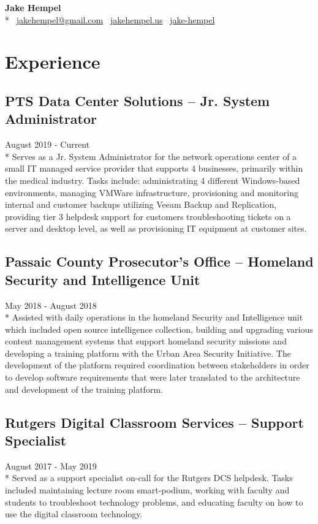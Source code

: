 \documentclass{article}
\begin{document}
\begin{samepage}
\begin{center}
\huge{\textbf{Jake Hempel}} \\*
\large{\faEnvelope \, \href{mailto:jakehempel@gmail.com}{jakehempel@gmail.com} 
\faGlobe \, \href{https://jakehempel.us}{jakehempel.us}}  
\faLinkedinSquare \, \href{https://www.linkedin.com/in/jake-hempel/}{jake-hempel}
\end{center}

\section{Experience}

\subsection{PTS Data Center Solutions -- Jr. System Administrator}
August 2019 - Current\\*
Serves as a Jr. System Administrator for the network operations center of a small IT managed service provider that supports 4 businesses, primarily within the medical industry. Tasks include: administrating 4 different Windows-based environments, managing VMWare infrastructure, provisioning and monitoring internal and customer backups utilizing Veeam Backup and Replication, providing tier 3 helpdesk support for customers troubleshooting tickets on a server and desktop level, as well as provisioning IT equipment at customer sites.

\subsection{Passaic County Prosecutor's Office -- Homeland Security and Intelligence Unit}
May 2018 - August 2018\\*
Assisted with daily operations in the homeland Security and Intelligence unit which included open source intelligence collection, building and upgrading various content management systems that support homeland security missions and developing a training platform with the Urban Area Security Initiative.  The development of the platform required coordination between stakeholders in order to develop software requirements that were later translated to the architecture and development of the training platform.

\subsection{Rutgers Digital Classroom Services -- Support Specialist}
August 2017 - May 2019\\*
Served as a support specialist on-call for the Rutgers DCS helpdesk. Tasks included maintaining lecture room smart-podium, working with faculty and students to troubleshoot technology problems, and educating faculty on how to use the digital classroom technology.


\end{samepage}
\end{document}
